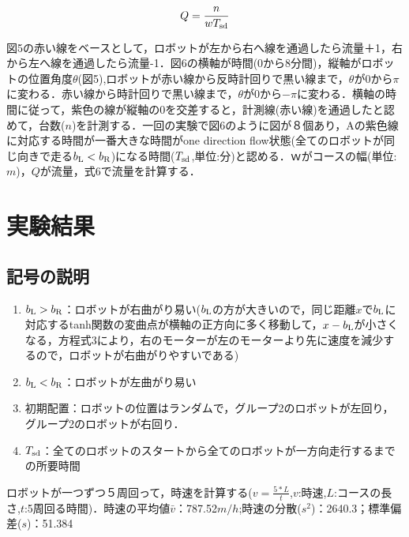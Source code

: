 \documentclass[twocolumn]{jarticle} %
\begin{document}
\begin{equation}
Q = \frac{n}{wT_{\rm sd}}
\end{equation}

図5の赤い線をベースとして，ロボットが左から右へ線を通過したら流量＋1，右から左へ線を通過したら流量-1．図6の横軸が時間(0から8分間)，縦軸がロボットの位置角度$\theta$(図5),ロボットが赤い線から反時計回りで黒い線まで，$\theta$が0から$\pi$に変わる．赤い線から時計回りで黒い線まで，$\theta$が0から$-\pi$に変わる．横軸の時間に従って，紫色の線が縦軸の0を交差すると，計測線(赤い線)を通過したと認めて，台数($n$)を計測する．一回の実験で図6のように図が８個あり，Aの紫色線に対応する時間が一番大きな時間がone direction flow状態(全てのロボットが同じ向きで走る$b_{\rm L}<b_{\rm R}$)になる時間($T_{\rm sd}$,単位:分)と認める．$ｗ$がコースの幅(単位:$m$)，$Q$が流量，式6で流量を計算する．


\section{実験結果}
\subsection{記号の説明}

\begin{enumerate}
\item $b_{\rm L}>b_{\rm R}$：ロボットが右曲がり易い($b_{\rm L}$の方が大きいので，同じ距離$x$で$b_{\rm L}$に対応するtanh関数の変曲点が横軸の正方向に多く移動して，$x-b_{\rm L}$が小さくなる，方程式3により，右のモーターが左のモーターより先に速度を減少するので，ロボットが右曲がりやすいである)
\item $b_{\rm L}<b_{\rm R}$：ロボットが左曲がり易い
\item 初期配置：ロボットの位置はランダムで，グループ2のロボットが左回り，グループ2のロボットが右回り．
\item $T_{\rm sd}$：全てのロボットのスタートから全てのロボットが一方向走行するまでの所要時間
\end{enumerate}


ロボットが一つずつ５周回って，時速を計算する($v=\frac{5*L}{t}$,$v$:時速,$L$:コースの長さ,$t$:5周回る時間)．時速の平均値$\bar v$：787.52$m/h$;時速の分散($s^2$)：2640.3；標準偏差($s$)：51.384
\end{document}

